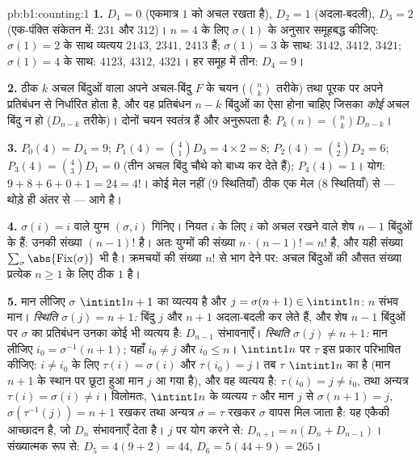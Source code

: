\begin{solution}{pb:b1:counting:1}
\textbf{1.} $D_1 = 0$ (एकमात्र  $1$ को अचल रखता है), $D_2 = 1$
(अदला-बदली), $D_3 = 2$ (एक-पंक्ति संकेतन में: $231$ और $312$)। $n = 4$ के
लिए $\sigma(1)$ के अनुसार समूहबद्ध कीजिए: $\sigma(1) = 2$ के साथ व्यत्यय
$2143$, $2341$, $2413$ हैं; $\sigma(1) = 3$ के साथ: $3142$, $3412$, $3421$;
$\sigma(1) = 4$ के साथ: $4123$, $4312$, $4321$। हर समूह में तीन: $D_4 = 9$।

\textbf{2.} ठीक $k$ अचल बिंदुओं वाला  अपने अचल-बिंदु  $F$ के
चयन ($\binom nk$ तरीके) तथा पूरक पर अपने प्रतिबंधन से निर्धारित होता है, और
वह प्रतिबंधन $n - k$ बिंदुओं का ऐसा  होना चाहिए जिसका \emph{कोई} अचल
बिंदु न हो ($D_{n-k}$ तरीके)। दोनों चयन स्वतंत्र हैं और अनुरूपता  है: $P_k(n) = \binom nk D_{n-k}$।

\textbf{3.} $P_0(4) = D_4 = 9$; $P_1(4) = \binom41 D_3 = 4 \times 2 = 8$;
$P_2(4) = \binom42 D_2 = 6$; $P_3(4) = \binom43 D_1 = 0$ (तीन अचल बिंदु चौथे
को बाध्य कर देते हैं); $P_4(4) = 1$। योग: $9 + 8 + 6 + 0 + 1 = 24 = 4!$। कोई
मेल नहीं ($9$ स्थितियाँ) ठीक एक मेल ($8$ स्थितियाँ) से --- थोड़े ही अंतर से
--- आगे है।

\textbf{4.} $\sigma(i) = i$ वाले युग्म $(\sigma, i)$ गिनिए। नियत $i$ के लिए
$i$ को अचल रखने वाले  शेष $n - 1$ बिंदुओं के  हैं: उनकी संख्या
$(n-1)!$ है। अतः युग्मों की संख्या $n \cdot (n-1)! = n!$ है, और यही संख्या
$\sum_\sigma \abs{\mathrm{Fix}(\sigma)}$ भी है। क्रमचयों की संख्या $n!$ से
भाग देने पर: अचल बिंदुओं की औसत संख्या प्रत्येक $n \geq 1$ के लिए ठीक $1$
है।

\textbf{5.} मान लीजिए $\sigma$ $\intint1{n+1}$ का व्यत्यय है और $j =
\sigma(n+1) \in \intint1n$: $n$ संभव मान। \emph{स्थिति $\sigma(j) = n+1$:}
बिंदु $j$ और $n+1$ अदला-बदली कर लेते हैं, और शेष $n - 1$ बिंदुओं पर $\sigma$
का प्रतिबंधन उनका कोई भी व्यत्यय है: $D_{n-1}$ संभावनाएँ। \emph{स्थिति
$\sigma(j) \neq n+1$:} मान लीजिए $i_0 = \sigma^{-1}(n+1)$; यहाँ $i_0 \neq j$
और $i_0 \leq n$। $\intint1n$ पर $\tau$ इस प्रकार परिभाषित कीजिए: $i \neq
i_0$ के लिए $\tau(i) = \sigma(i)$ और $\tau(i_0) = j$। तब $\tau$ $\intint1n$
का  है (मान $n+1$ के स्थान पर छूटा हुआ मान $j$ आ गया है), और वह
व्यत्यय है: $\tau(i_0) = j \neq i_0$, तथा अन्यत्र $\tau(i) = \sigma(i) \neq
i$। विलोमतः, $\intint1n$ के व्यत्यय $\tau$ और मान $j$ से $\sigma(n+1) = j$,
$\sigma(\tau^{-1}(j)) = n+1$ रखकर तथा अन्यत्र $\sigma = \tau$ रखकर $\sigma$
वापस मिल जाता है: यह एकैकी आच्छादन है, जो $D_n$ संभावनाएँ देता है। $j$ पर
योग करने से: $D_{n+1} = n(D_n + D_{n-1})$। संख्यात्मक रूप से: $D_5 = 4(9 +
2) = 44$, $D_6 = 5(44 + 9) = 265$।


\end{solution}
